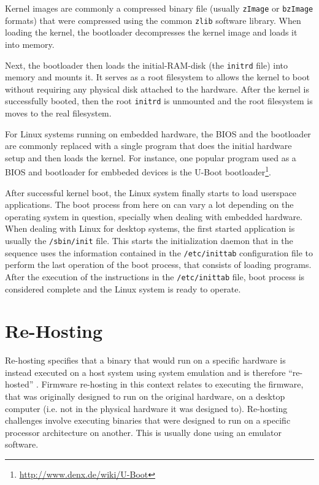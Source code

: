 Kernel images are commonly a compressed binary file (usually {\tt zImage} or {\tt bzImage} formats) that were compressed using the common {\tt zlib} software library. When loading the kernel, the bootloader decompresses the kernel image and loads it into memory.

Next, the bootloader then loads the initial-RAM-disk (the {\tt initrd} file) into memory and mounts it. It serves as a root filesystem to allows the kernel to boot without requiring any physical disk attached to the hardware. After the kernel is successfully booted, then the root {\tt initrd} is unmounted and the root filesystem is moves to the real filesystem.

For Linux systems running on embedded hardware, the BIOS and the bootloader are commonly replaced with a single program that does the initial hardware setup and then loads the kernel. For instance, one popular program used as a BIOS and bootloader for embbeded devices is the U-Boot bootloader\footnote{\url{http://www.denx.de/wiki/U-Boot}}.

After successful kernel boot, the Linux system finally starts to load userspace applications. The boot process from here on can vary a lot depending on the operating system in question, specially when dealing with embedded hardware. When dealing with Linux for desktop systems, the first started application is usually the {\tt /sbin/init} file. This starts the initialization daemon that in the sequence uses the information contained in the {\tt /etc/inittab} configuration file to perform the last operation of the boot process, that consists of loading programs. After the execution of the instructions in the {\tt /etc/inittab} file, boot process is considered complete and the Linux system is ready to operate.

\section{Re-Hosting}
\label{sec:rehosting}

Re-hosting specifies that a binary that would run on a specific hardware is instead executed on a host system using system emulation and is therefore ``re-hosted'' \cite{firmware-challenges}. Firmware re-hosting in this context relates to executing the firmware, that was originally designed to run on the original hardware, on a desktop computer (i.e. not in the physical hardware it was designed to). Re-hosting challenges involve executing binaries that were designed to run on a specific processor architecture on another. This is usually done using an emulator software.

